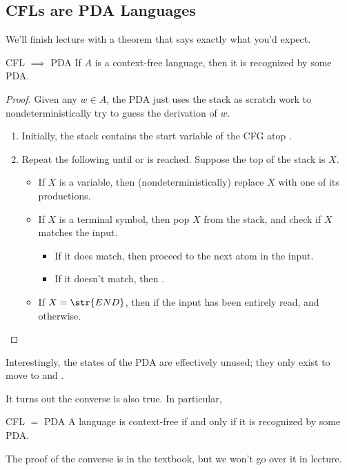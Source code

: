 \subsection{CFLs are PDA Languages}

We'll finish lecture with a theorem that says
exactly what you'd expect.

\begin{theorem}{CFL $\implies$ PDA}
    If $A$ is a context-free language, then it is recognized by some PDA.
\end{theorem}

\begin{proof}
    Given any $w \in A$, the PDA just uses the stack as scratch work
    to nondeterministically try to guess the derivation of $w$.
    \begin{enumerate}
        \item Initially, the stack contains
        the start variable of the CFG atop .
        \item Repeat the following until 
        or  is reached.  Suppose the top of the stack is $X$.
        \begin{itemize}
            \item If $X$ is a variable,
            then (nondeterministically) replace $X$ with
            one of its productions.
            \item If $X$ is a terminal symbol,
            then pop $X$ from the stack, and
            check if $X$ matches the input.
            \begin{itemize}
                \item If it does match,
                then proceed to the next atom in the input.
                \item If it doesn't match, then .
            \end{itemize}
            \item If $X = \str{END}$, then
             if the input has been entirely read,
            and  otherwise.
        \end{itemize}
    \end{enumerate}
\end{proof}

\begin{remark}
    Interestingly, the states of the PDA are effectively unused;
    they only exist to move to  and .
\end{remark}

It turns out the converse is also true.  In particular,

\begin{theorem}{CFL $=$ PDA}
    A language is context-free if and only if
    it is recognized by some PDA.
\end{theorem}

The proof of the converse is in the textbook,
but we won't go over it in lecture.

